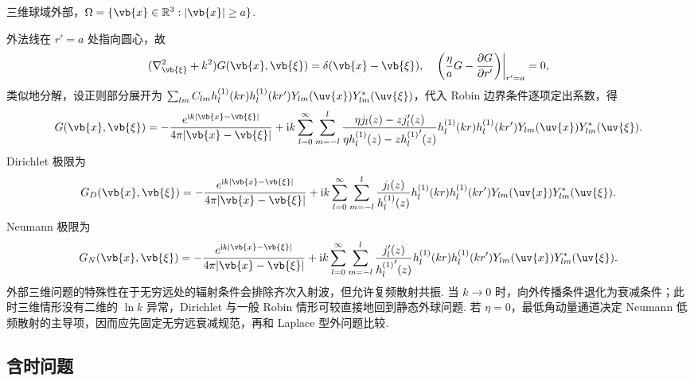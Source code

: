 \begin{example}
	三维球域外部，\(\Omega=\{\vb{x}\in\mathbb{R}^3:|\vb{x}|\geq a\}\).
	
	外法线在 \(r'=a\) 处指向圆心，故
	\begin{equation*}
		(\nabla_{\vb{\xi}}^2+k^2)G(\vb{x},\vb{\xi})=\delta(\vb{x}-\vb{\xi}),
		\quad
		\left.\left(\frac{\eta}{a}G-\frac{\partial G}{\partial r'}\right)\right|_{r'=a}=0,
	\end{equation*}
	类似地分解，设正则部分展开为 \(\sum_{lm}C_{lm}h_l^{(1)}(kr)h_l^{(1)}(kr')Y_{lm}(\uv{x})Y_{lm}^*(\uv{\xi})\)，代入 Robin 边界条件逐项定出系数，得
	\begin{equation*}
		G(\vb{x},\vb{\xi})=-\frac{e^{\mathrm{i}k|\vb{x}-\vb{\xi}|}}{4\pi|\vb{x}-\vb{\xi}|}
		+\mathrm{i}k\sum_{l=0}^{\infty}\sum_{m=-l}^{l}
		\frac{\eta j_l(z)-zj_l'(z)}{\eta h_l^{(1)}(z)-z{h_l^{(1)}}'(z)}
		h_l^{(1)}(kr)h_l^{(1)}(kr')Y_{lm}(\uv{x})Y_{lm}^*(\uv{\xi}).
	\end{equation*}
	Dirichlet 极限为
	\begin{equation*}
		G_D(\vb{x},\vb{\xi})=-\frac{e^{\mathrm{i}k|\vb{x}-\vb{\xi}|}}{4\pi|\vb{x}-\vb{\xi}|}
		+\mathrm{i}k\sum_{l=0}^{\infty}\sum_{m=-l}^{l}
		\frac{j_l(z)}{h_l^{(1)}(z)}h_l^{(1)}(kr)h_l^{(1)}(kr')Y_{lm}(\uv{x})Y_{lm}^*(\uv{\xi}).
	\end{equation*}
	Neumann 极限为
	\begin{equation*}
		G_N(\vb{x},\vb{\xi})=-\frac{e^{\mathrm{i}k|\vb{x}-\vb{\xi}|}}{4\pi|\vb{x}-\vb{\xi}|}
		+\mathrm{i}k\sum_{l=0}^{\infty}\sum_{m=-l}^{l}
		\frac{j_l'(z)}{{h_l^{(1)}}'(z)}h_l^{(1)}(kr)h_l^{(1)}(kr')Y_{lm}(\uv{x})Y_{lm}^*(\uv{\xi}).
	\end{equation*}
	外部三维问题的特殊性在于无穷远处的辐射条件会排除齐次入射波，但允许复频散射共振. 当 \(k\to0\) 时，向外传播条件退化为衰减条件；此时三维情形没有二维的 \(\ln k\) 异常，Dirichlet 与一般 Robin 情形可较直接地回到静态外球问题. 若 \(\eta=0\)，最低角动量通道决定 Neumann 低频散射的主导项，因而应先固定无穷远衰减规范，再和 Laplace 型外问题比较.
\end{example}


\subsection{含时问题}

